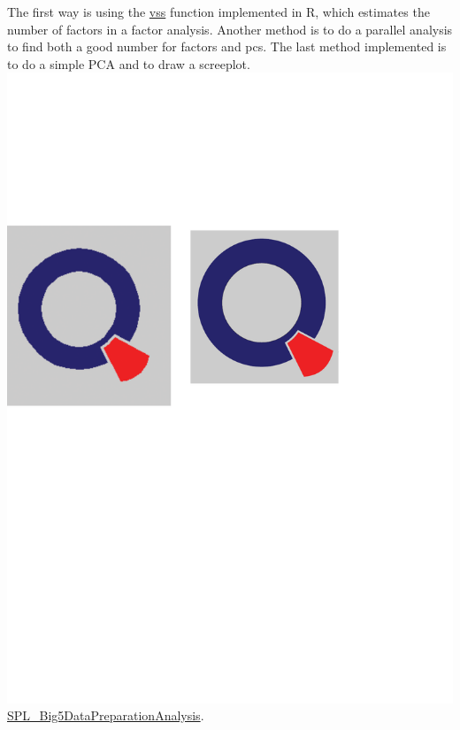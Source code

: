 The first way is using the \href{https://www.rdocumentation.org/packages/psych/versions/1.8.4/topics/VSS}{vss} function implemented in R, which estimates the number of factors in a factor analysis. Another method is to do a parallel analysis to find both a good number for factors and pcs. The last method implemented is to do a simple PCA and to draw a screeplot. \href{https://github.com/Matthias2193/SPL/blob/3d1d23303132ad8092531f9474fbf78f5a8df3c5/SPL_Big5DataPreparationAnalysis/SPL_Big5DataPreparationAnalysis.R#L20-L54}{\includegraphics[scale = 0.06]{Figures/qletlogo.pdf}SPL\_Big5DataPreparationAnalysis}.
\newline
